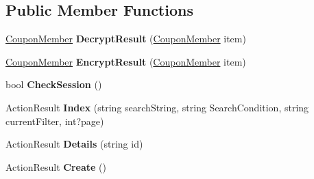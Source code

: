 \subsection*{Public Member Functions}
\begin{DoxyCompactItemize}
\item 
\hyperlink{class_cloud_bread_admin_web_1_1_coupon_member}{Coupon\+Member} {\bfseries Decrypt\+Result} (\hyperlink{class_cloud_bread_admin_web_1_1_coupon_member}{Coupon\+Member} item)\hypertarget{class_cloud_bread_admin_web_1_1_controllers_1_1_coupon_members_controller_a4b28a110f6f041df49f9325f66c08a65}{}\label{class_cloud_bread_admin_web_1_1_controllers_1_1_coupon_members_controller_a4b28a110f6f041df49f9325f66c08a65}

\item 
\hyperlink{class_cloud_bread_admin_web_1_1_coupon_member}{Coupon\+Member} {\bfseries Encrypt\+Result} (\hyperlink{class_cloud_bread_admin_web_1_1_coupon_member}{Coupon\+Member} item)\hypertarget{class_cloud_bread_admin_web_1_1_controllers_1_1_coupon_members_controller_afbf434179164c6cc949266673faafee2}{}\label{class_cloud_bread_admin_web_1_1_controllers_1_1_coupon_members_controller_afbf434179164c6cc949266673faafee2}

\item 
bool {\bfseries Check\+Session} ()\hypertarget{class_cloud_bread_admin_web_1_1_controllers_1_1_coupon_members_controller_a275bf58a4d5eff7ede91e87ad325699d}{}\label{class_cloud_bread_admin_web_1_1_controllers_1_1_coupon_members_controller_a275bf58a4d5eff7ede91e87ad325699d}

\item 
Action\+Result {\bfseries Index} (string search\+String, string Search\+Condition, string current\+Filter, int?page)\hypertarget{class_cloud_bread_admin_web_1_1_controllers_1_1_coupon_members_controller_adf0e90c87a5249434f30f7b392e7d5a0}{}\label{class_cloud_bread_admin_web_1_1_controllers_1_1_coupon_members_controller_adf0e90c87a5249434f30f7b392e7d5a0}

\item 
Action\+Result {\bfseries Details} (string id)\hypertarget{class_cloud_bread_admin_web_1_1_controllers_1_1_coupon_members_controller_a8636252869c24279e294fd50e0b94b10}{}\label{class_cloud_bread_admin_web_1_1_controllers_1_1_coupon_members_controller_a8636252869c24279e294fd50e0b94b10}

\item 
Action\+Result {\bfseries Create} ()\hypertarget{class_cloud_bread_admin_web_1_1_controllers_1_1_coupon_members_controller_abedc00f664be9101a31e759e497324bb}{}\label{class_cloud_bread_admin_web_1_1_controllers_1_1_coupon_members_controller_abedc00f664be9101a31e759e497324bb}


\end{DoxyCompactItemize}
